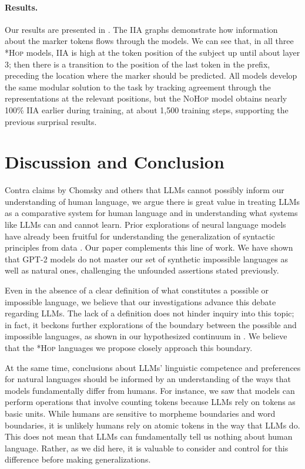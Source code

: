 \documentclass[11pt]{article}
\begin{document}
\paragraph{Results.}

Our results are presented in . The IIA graphs
demonstrate how information about the marker tokens flows through the models.
We can see that, in all three \textsc{*Hop} models, IIA is high at the token position 
of the subject up until about layer 3; then there is a transition to the position of
the last token in the prefix, preceding the location where the marker should be predicted.
All models develop the same modular solution to the task by tracking
agreement through the representations at the relevant positions, but the
\textsc{NoHop} model obtains nearly 100\% IIA earlier during training, at about
1,500 training steps, supporting the previous surprisal results.

\section{Discussion and Conclusion}


Contra claims by Chomsky and others that LLMs cannot possibly inform our understanding of human language, we argue there is great value in treating LLMs as a comparative system for human language and in understanding what systems like LLMs can and cannot learn. 
Prior explorations of neural language models have already been fruitful for understanding the generalization of syntactic principles from data \cite{wilcox-etal-2018-rnn, marvin-linzen-2018-targeted, futrell-etal-2019-neural, prasad-etal-2019-using, hu-etal-2020-systematic}. Our paper complements this line of work.
We have shown that GPT-2 models do not master our set of synthetic impossible languages as well as natural ones, challenging the unfounded assertions stated previously.

Even in the absence of a clear definition of what constitutes a possible or impossible language, we believe that our investigations advance this debate regarding LLMs. The lack of a definition does not hinder inquiry into this topic; in fact, it beckons further explorations of the boundary between the possible and impossible languages, as shown in our hypothesized continuum in . We believe that the \textsc{*Hop} languages we propose closely approach this boundary.

At the same time, conclusions about LLMs' linguistic competence and preferences for natural languages should be informed by an understanding of the ways that models fundamentally differ from humans. For instance, we saw that models can perform operations that involve counting tokens because LLMs rely on tokens as basic units. While humans are sensitive to morpheme boundaries and word boundaries, it is unlikely humans rely on atomic tokens in the way that LLMs do.
This does not mean that LLMs can fundamentally tell us nothing about human language.
Rather, as we did here, it is valuable to consider and control for this difference before making generalizations.
\end{document}

